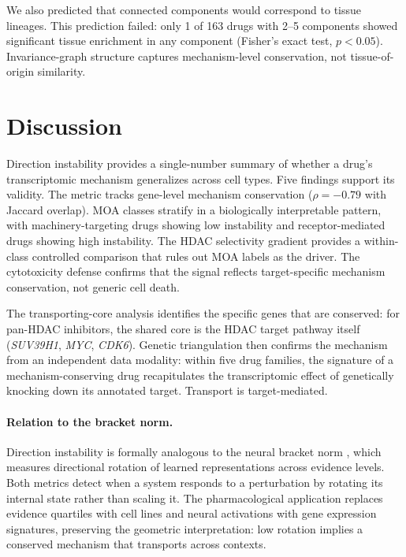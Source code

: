 \documentclass{article}
\begin{document}
We also predicted that connected components would correspond to
tissue lineages. This prediction failed: only 1 of 163 drugs with
2--5 components showed significant tissue enrichment in any component
(Fisher's exact test, $p < 0.05$). Invariance-graph structure
captures mechanism-level conservation, not tissue-of-origin similarity.

\section{Discussion}

Direction instability provides a single-number summary of whether a drug's
transcriptomic mechanism generalizes across cell types. Five findings
support its validity. The metric tracks gene-level mechanism conservation
($\rho = -0.79$ with Jaccard overlap). MOA classes stratify in a
biologically interpretable pattern, with machinery-targeting drugs
showing low instability and receptor-mediated drugs showing high
instability. The HDAC selectivity gradient provides a within-class
controlled comparison that rules out MOA labels as the driver. The
cytotoxicity defense confirms that the signal reflects target-specific
mechanism conservation, not generic cell death.

The transporting-core analysis identifies the specific genes that
are conserved: for pan-HDAC inhibitors, the shared core is the HDAC
target pathway itself (\emph{SUV39H1}, \emph{MYC}, \emph{CDK6}).
Genetic triangulation then confirms the mechanism from an independent
data modality: within five drug families, the signature of a
mechanism-conserving drug recapitulates the transcriptomic effect of
genetically knocking down its annotated target.
Transport is target-mediated.

\paragraph{Relation to the bracket norm.}
Direction instability is formally analogous to the neural bracket norm
\citep{tower2026bracket}, which measures directional rotation of
learned representations across evidence levels. Both metrics detect when a
system responds to a perturbation by rotating its internal state rather
than scaling it. The pharmacological application replaces evidence
quartiles with cell lines and neural activations with gene expression
signatures, preserving the geometric interpretation: low rotation implies
a conserved mechanism that transports across contexts.
\end{document}
